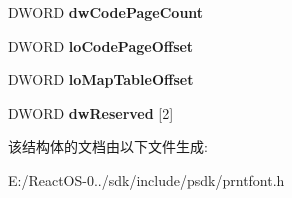 \begin{DoxyCompactItemize}
\mbox{\label{struct___u_n_i___g_l_y_p_h_s_e_t_d_a_t_a_a21e48ec0a59283a513fe54e45b738a64}} 
D\+W\+O\+RD {\bfseries dw\+Code\+Page\+Count}
\item 
\mbox{\label{struct___u_n_i___g_l_y_p_h_s_e_t_d_a_t_a_a82826ed6978f9be27f0b0c3c4469cb11}} 
D\+W\+O\+RD {\bfseries lo\+Code\+Page\+Offset}
\item 
\mbox{\label{struct___u_n_i___g_l_y_p_h_s_e_t_d_a_t_a_aa3214fbda356c2388a48a6c58b2df11b}} 
D\+W\+O\+RD {\bfseries lo\+Map\+Table\+Offset}
\item 
\mbox{\label{struct___u_n_i___g_l_y_p_h_s_e_t_d_a_t_a_ae32dcdefe24e57836b97606ee55fda2f}} 
D\+W\+O\+RD {\bfseries dw\+Reserved} \mbox{[}2\mbox{]}
\end{DoxyCompactItemize}


该结构体的文档由以下文件生成\+:\begin{DoxyCompactItemize}
\item 
E\+:/\+React\+O\+S-\/0../sdk/include/psdk/prntfont.\+h\end{DoxyCompactItemize}

